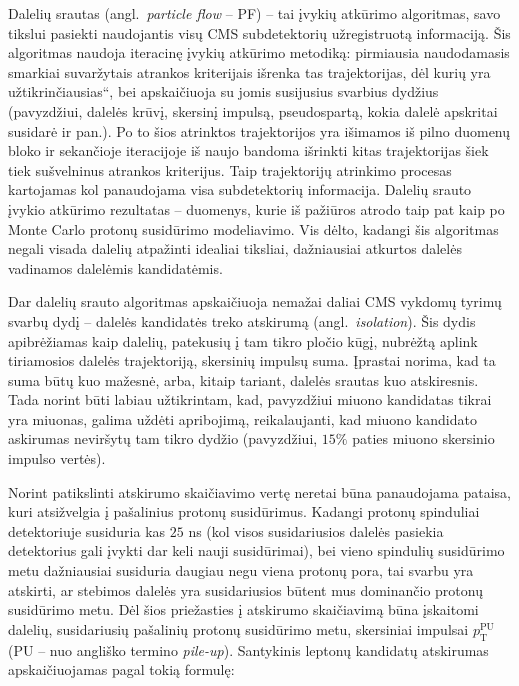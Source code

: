 \documentclass[a4paper, 12pt]{article}
\newcommand{\ltq}[1]{{\quotedblbase{}#1\textquotedblleft{}}}
\newlength\q
\begin{document}
Dalelių srautas (angl.\ \textit{particle flow} -- PF) -- tai įvykių atkūrimo algoritmas, savo tikslui pasiekti
naudojantis visų CMS subdetektorių užregistruotą informaciją.
Šis algoritmas naudoja iteracinę įvykių atkūrimo metodiką: pirmiausia naudodamasis smarkiai suvaržytais
atrankos kriterijais išrenka tas trajektorijas, dėl kurių yra \ltq{užtikrinčiausias}, bei apskaičiuoja
su jomis susijusius svarbius dydžius (pavyzdžiui, dalelės krūvį, skersinį impulsą, pseudospartą,
kokia dalelė apskritai susidarė ir pan.).
Po to šios atrinktos trajektorijos yra išimamos iš pilno duomenų bloko ir sekančioje iteracijoje iš
naujo bandoma išrinkti kitas trajektorijas šiek tiek sušvelninus atrankos kriterijus.
Taip trajektorijų atrinkimo procesas kartojamas kol panaudojama visa subdetektorių informacija.
Dalelių srauto įvykio atkūrimo rezultatas -- duomenys, kurie iš pažiūros atrodo taip pat kaip po
Monte Carlo protonų susidūrimo modeliavimo.
Vis dėlto, kadangi šis algoritmas negali visada dalelių atpažinti idealiai tiksliai, dažniausiai
atkurtos dalelės vadinamos dalelėmis kandidatėmis.

Dar dalelių srauto algoritmas apskaičiuoja nemažai daliai CMS vykdomų tyrimų svarbų dydį -- dalelės
kandidatės treko atskirumą (angl.\ \textit{isolation}).
Šis dydis apibrėžiamas kaip dalelių, patekusių į tam tikro pločio kūgį, nubrėžtą aplink tiriamosios
dalelės trajektoriją, skersinių impulsų suma.
Įprastai norima, kad ta suma būtų kuo mažesnė, arba, kitaip tariant, dalelės srautas kuo atskiresnis.
Tada norint būti labiau užtikrintam, kad, pavyzdžiui miuono kandidatas tikrai yra miuonas, galima
uždėti apribojimą, reikalaujanti, kad miuono kandidato askirumas neviršytų tam tikro dydžio
(pavyzdžiui, $15\%$ paties miuono skersinio impulso vertės).

Norint patikslinti atskirumo skaičiavimo vertę neretai būna panaudojama pataisa, kuri atsižvelgia į
pašalinius protonų susidūrimus.
Kadangi protonų spinduliai detektoriuje susiduria kas $25$ ns (kol visos susidariusios dalelės
pasiekia detektorius gali įvykti dar keli nauji susidūrimai), bei vieno spindulių susidūrimo metu
dažniausiai susiduria daugiau negu viena protonų pora, tai svarbu yra atskirti, ar stebimos dalelės
yra susidariusios būtent mus dominančio protonų susidūrimo metu.
Dėl šios priežasties į atskirumo skaičiavimą būna įskaitomi dalelių, susidariusių pašalinių
protonų susidūrimo metu, skersiniai impulsai $p_{\mathrm{T}}^{\mathrm{PU}}$ (PU -- nuo angliško
termino \textit{pile-up}).
Santykinis leptonų kandidatų atskirumas apskaičiuojamas pagal tokią formulę:
\end{document}
